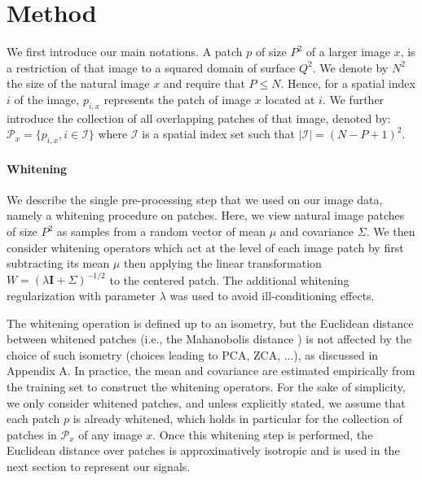 \documentclass{article} %
\begin{document}
\section{Method}\label{method}%
We first introduce our main notations. A patch $p$ of size $P^2$ of a larger image $x$, is a  restriction of that image to a squared domain of surface $Q^2$. We denote by $N^2$ the size of the natural image $x$ and require that $P\leq N$. Hence, for a spatial index $i$ of the image,  $p_{i,x}$ represents the patch of image $x$ located at $i$.
We further introduce the collection of all overlapping patches of that image, denoted by: $\mathcal{P}_x=\{p_{i,x},i\in\mathcal{I}\}$ where $\mathcal{I}$ is a spatial index set such that $|\mathcal{I}|=(N-P+1)
^2$. 
\paragraph{Whitening} We describe the single pre-processing step that we used on our image data, namely a whitening procedure on patches. %
Here, we view natural image patches of size $P^2$ as samples from a random vector of mean $\mu$ and covariance   $\Sigma$. 
We then consider  whitening operators which act at the level of each image patch by first subtracting its mean $\mu$ then applying the linear transformation $W=(\lambda \mathbf{I}+\Sigma
)^{-1/2}$ to the centered patch. The additional whitening regularization with parameter $\lambda$ was used to avoid ill-conditioning effects.

The whitening operation is defined up to an isometry, but the Euclidean distance between whitened patches (i.e., the Mahanobolis distance \citep{chandra1936generalised}) is not affected by the choice of such isometry (choices leading to PCA, ZCA, ...), as discussed in Appendix A.
In practice,  the mean and covariance are estimated empirically from the training set to construct the whitening operators. For the sake of simplicity, we  only  consider whitened patches, and unless explicitly stated, we assume that each patch $p$ is already whitened, which holds in particular for the collection of patches in $\mathcal{P}_x$ of any image $x$. 
Once this whitening step is performed, the Euclidean distance over patches is approximatively isotropic and is used in the next section to represent our signals.
\end{document}

